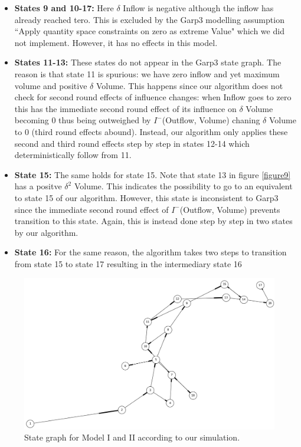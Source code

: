 \documentclass{article}
\begin{document}
\begin{itemize}
	\item \textbf{States 9 and 10-17:} Here $\delta$ Inflow is negative although the inflow has already reached tero. This is excluded by the Garp3 modelling assumption ``Apply quantity space constraints on zero as extreme Value" which we did not implement. However, it has no effects in this model.
	\item \textbf{States 11-13:} These states do not appear in the Garp3 state graph. The reason is that state 11 is spurious: we have zero inflow and yet maximum volume and positive $\delta$ Volume. This happens since our algorithm does not check for second round effects of influence changes: when Inflow goes to zero this has the immediate second round effect of its influence on $\delta$ Volume becoming 0 thus being outweighed by $I^-$(Outflow, Volume) chaning $\delta$ Volume to 0 (third round effects abound). Instead, our algorithm only applies these second and third round effects step by step in states 12-14 which deterministically follow from 11. 
	\item  \textbf{State 15:} The same holds for state 15. Note that state 13 in figure \ref{figure9} has a positve $\delta^2$ Volume. This indicates the possibility to go to an equivalent to state 15 of our algorithm. However, this state is inconsistent to Garp3 since the immediate second round effect of $I^-$(Outflow, Volume) prevents transition to this state. Again, this is instead done step by step in two states by our algorithm.
	\item \textbf{State 16:} For the same reason, the algorithm takes two steps to transition from state 15 to state 17 resulting in the intermediary state 16
\end{itemize}



\begin{figure}
	\centering
	\includegraphics[scale=0.3]{Ok_State_Graph.png}
	\caption{State graph for Model I and II according to our simulation. }
	\label{figure8}
\end{figure}
\end{document}
